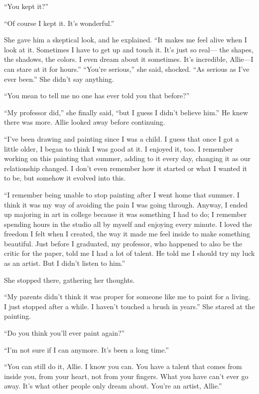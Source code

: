 \documentclass[10pt, twoside, openright]{book}
\begin{document}
``You kept it?''

``Of course I kept it. It's wonderful.''


She gave him a skeptical look, and he explained. ``It makes me feel
alive when I look at it. Sometimes I have to get up and touch it. It's
just so real--- the shapes, the shadows, the colors. I even dream about
it sometimes. It's incredible, Allie---I can stare at it for hours.''
``You're serious,'' she said, shocked. ``As serious as I've ever been.''
She didn't say anything.


``You mean to tell me no one has ever told you that before?''

``My professor did,'' she finally said, ``but I guess I didn't believe
him.'' He knew there was more. Allie looked away before continuing.


``I've been drawing and painting since I was a child. I guess that once
I got a little older, I began to think I was good at it. I enjoyed it,
too. I remember working on this painting that summer, adding to it every
day, changing it as our relationship changed. I don't even remember how
it started or what I wanted it to be, but somehow it evolved into this.

``I remember being unable to stop painting after I went home that
summer. I think it was my way of avoiding the pain I was going through.
Anyway, I ended up majoring in art in college because it was something I
had to do; I remember spending hours in the studio all by myself and
enjoying every minute. I loved the freedom I felt when I created, the
way it made me feel inside to make something beautiful. Just before I
graduated, my professor, who happened to also be the critic for the
paper, told me I had a lot of talent. He told me I should try my luck as
an artist. But I didn't listen to him.''


She stopped there, gathering her thoughts.


``My parents didn't think it was proper for someone like me to paint for
a living. I just stopped after a while. I haven't touched a brush in
years.'' She stared at the painting.


``Do you think you'll ever paint again?''

``I'm not sure if I can anymore. It's been a long time.''


``You can still do it, Allie. I know you can. You have a talent that
comes from inside you, from your heart, not from your fingers. What you
have can't ever go away. It's what other people only dream about. You're
an artist, Allie.''
\end{document}
